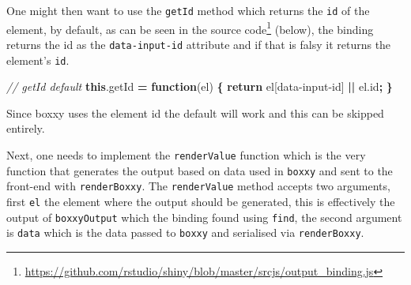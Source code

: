 \documentclass[
]{krantz}
\makeatletter
\newenvironment{Shaded}{\begin{snugshade}}{\end{snugshade}}
\newcommand{\AttributeTok}[1]{\textcolor[rgb]{0.61,0.61,0.61}{#1}}
\newcommand{\CommentTok}[1]{\textcolor[rgb]{0.37,0.37,0.37}{\textit{#1}}}
\newcommand{\ControlFlowTok}[1]{\textcolor[rgb]{0.27,0.27,0.27}{\textbf{#1}}}
\newcommand{\DataTypeTok}[1]{\textcolor[rgb]{0.27,0.27,0.27}{#1}}
\newcommand{\KeywordTok}[1]{\textcolor[rgb]{0.27,0.27,0.27}{\textbf{#1}}}
\newcommand{\NormalTok}[1]{#1}
\newcommand{\OperatorTok}[1]{\textcolor[rgb]{0.43,0.43,0.43}{\textbf{#1}}}
\newcommand{\StringTok}[1]{\textcolor[rgb]{0.5,0.5,0.5}{#1}}
\newcommand{\VariableTok}[1]{\textcolor[rgb]{0,0,0}{#1}}
\renewcommand{\href}[2]{#2\footnote{\url{#1}}}
\newenvironment{kframe}{%
\medskip{}
\setlength{\fboxsep}{.8em}
 \def\at@end@of@kframe{}%
 \ifinner\ifhmode%
  \def\at@end@of@kframe{\end{minipage}}%
  \begin{minipage}{\columnwidth}%
 \fi\fi%
 \def\FrameCommand##1{\hskip\@totalleftmargin \hskip-\fboxsep
 \colorbox{shadecolor}{##1}\hskip-\fboxsep
     \hskip-\linewidth \hskip-\@totalleftmargin \hskip\columnwidth}%
 \MakeFramed {\advance\hsize-\width
   \@totalleftmargin\z@ \linewidth\hsize
   \@setminipage}}%
 {\par\unskip\endMakeFramed%
 \at@end@of@kframe}
\renewenvironment{Shaded}{\begin{kframe}}{\end{kframe}}
\makeatother
\begin{document}
\begin{Shaded}
\end{Shaded}

One might then want to use the \texttt{getId} method which returns the \texttt{id} of the element, by default, as can be seen in the \href{https://github.com/rstudio/shiny/blob/master/srcjs/output_binding.js}{source code} (below), the binding returns the id as the \texttt{data-input-id} attribute and if that is falsy it returns the element's \texttt{id}.

\begin{Shaded}
\begin{Highlighting}[]
\CommentTok{// getId default}
\KeywordTok{this}\NormalTok{.}\AttributeTok{getId} \OperatorTok{=} \KeywordTok{function}\NormalTok{(el) }\OperatorTok{\{}
  \ControlFlowTok{return}\NormalTok{ el[}\StringTok{\textquotesingle{}data{-}input{-}id\textquotesingle{}}\NormalTok{] }\OperatorTok{||} \VariableTok{el}\NormalTok{.}\AttributeTok{id}\OperatorTok{;}
\OperatorTok{\}}
\end{Highlighting}
\end{Shaded}

Since boxxy uses the element id the default will work and this can be skipped entirely.

Next, one needs to implement the \texttt{renderValue} function which is the very function that generates the output based on data used in \texttt{boxxy} and sent to the front-end with \texttt{renderBoxxy}. The \texttt{renderValue} method accepts two arguments, first \texttt{el} the element where the output should be generated, this is effectively the output of \texttt{boxxyOutput} which the binding found using \texttt{find}, the second argument is \texttt{data} which is the data passed to \texttt{boxxy} and serialised via \texttt{renderBoxxy}.
\end{document}
